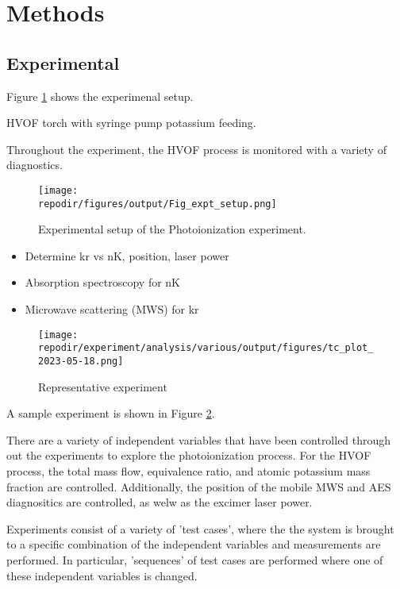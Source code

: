 \section{Methods}


\subsection{Experimental}

Figure \ref{fig:expt_setup} shows the experimenal setup. 

HVOF torch with syringe pump potassium feeding. 

Throughout the experiment, the HVOF process is monitored with a variety of diagnostics. 


\begin{figure}[h]
    \texttt{[image: \\repodir/figures/output/Fig\_expt\_setup.png]} 
    \caption{Experimental setup of the Photoionization experiment.}
    \label{fig:expt_setup}
\end{figure}

\begin{itemize}
\item Determine kr vs nK, position, laser power
\item Absorption spectroscopy for nK
\item Microwave scattering (MWS) for kr 
\end{itemize}


\begin{figure}[p]
    \texttt{[image: \\repodir/experiment/analysis/various/output/figures/tc\_plot\_2023-05-18.png]} 
    \caption{Representative experiment}
    \label{fig:expt_example}
\end{figure}

A sample experiment is shown in Figure \ref{fig:expt_example}.

There are a variety of independent variables that have been controlled through out the experiments to explore the photoionization process. For the HVOF process, the total mass flow, equivalence ratio, and atomic potassium mass fraction are controlled. Additionally, the position of the mobile MWS and AES diagnositics are controlled, as welw as the excimer laser power. 

Experiments consist of a variety of 'test cases', where the the system is brought to a specific combination of the independent variables and measurements are performed. In particular, 'sequences' of test cases are performed where one of these independent variables is changed. 


